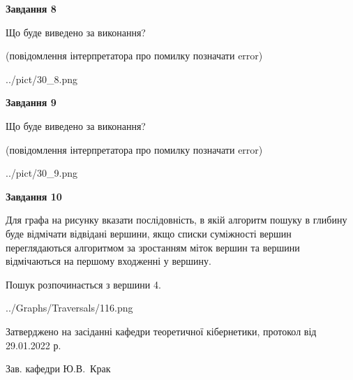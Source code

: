 \documentclass[12pt, ukrainian]{article}
\begin{document}
{\begin {large}
{\begin {center}\textbf{Завдання 8}\end {center}}\par
Що буде виведено за виконання?\par
 (повідомлення інтерпретатора про помилку позначати error)
\begin{center}
	{../pict/30_8.png}
\end{center}
\newpage

{\begin {center}\textbf{Завдання 9}\end {center}}\par
Що буде виведено за виконання?\par
 (повідомлення інтерпретатора про помилку позначати error)\par
\begin{center}
	{../pict/30_9.png}
\end{center}
\newpage

{\begin {center}\textbf{Завдання 10}\end {center}}\par
Для графа на рисунку вказати послідовність, в якій алгоритм пошуку в глибину буде відмічати відвідані вершини, якщо списки суміжності вершин переглядаються алгоритмом за зростанням міток вершин та вершини відмічаються на першому вход\-женні у вершину.\par
Пошук розпочинається з вершини 4.\par

\begin{center}
	{../Graphs/Traversals/116.png}
\end{center}\par
\newpage


\end {large}
}
{\smallskip \begin {small} Затверджено на засіданні кафедри теоретичної кібернетики, протокол  від   29.01.2022 р.\par\smallskip\smallskip
{\parbox {6.5 cm}{Зав. кафедри \dotfill Ю.В.~Крак}} \end{small}}
\end{document}
